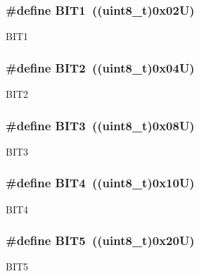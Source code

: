 \subsubsection[{\texorpdfstring{B\+I\+T1}{BIT1}}]{\setlength{\rightskip}{0pt plus 5cm}\#define B\+I\+T1~((uint8\+\_\+t)0x02\+U)}\hypertarget{group_____bits___masks_ga601923eba46784638244c1ebf2622a2a}{}\label{group_____bits___masks_ga601923eba46784638244c1ebf2622a2a}
B\+I\+T1 
\subsubsection[{\texorpdfstring{B\+I\+T2}{BIT2}}]{\setlength{\rightskip}{0pt plus 5cm}\#define B\+I\+T2~((uint8\+\_\+t)0x04\+U)}\hypertarget{group_____bits___masks_ga9c9560bccccb00174801c728f1ed1399}{}\label{group_____bits___masks_ga9c9560bccccb00174801c728f1ed1399}
B\+I\+T2 
\subsubsection[{\texorpdfstring{B\+I\+T3}{BIT3}}]{\setlength{\rightskip}{0pt plus 5cm}\#define B\+I\+T3~((uint8\+\_\+t)0x08\+U)}\hypertarget{group_____bits___masks_ga8e44574a8a8becc885b05f3bc367ef6a}{}\label{group_____bits___masks_ga8e44574a8a8becc885b05f3bc367ef6a}
B\+I\+T3 
\subsubsection[{\texorpdfstring{B\+I\+T4}{BIT4}}]{\setlength{\rightskip}{0pt plus 5cm}\#define B\+I\+T4~((uint8\+\_\+t)0x10\+U)}\hypertarget{group_____bits___masks_gaa731e0b6cf75f4e637ee88959315f5e4}{}\label{group_____bits___masks_gaa731e0b6cf75f4e637ee88959315f5e4}
B\+I\+T4 
\subsubsection[{\texorpdfstring{B\+I\+T5}{BIT5}}]{\setlength{\rightskip}{0pt plus 5cm}\#define B\+I\+T5~((uint8\+\_\+t)0x20\+U)}\hypertarget{group_____bits___masks_gae692bc3df48028ceb1ddc2534a993bb8}{}\label{group_____bits___masks_gae692bc3df48028ceb1ddc2534a993bb8}
B\+I\+T5 
